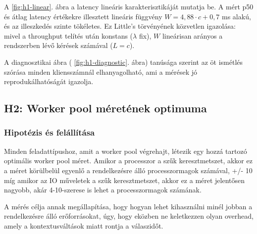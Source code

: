 \documentclass[11pt,a4paper]{article}
\begin{document}
A \ref{fig:h1-linear}. ábra a latency lineáris karakterisztikáját mutatja be. A mért
p50 és átlag latency értékekre illesztett lineáris függvény $W = 4{,}88 \cdot c + 0{,}7$
ms alakú, és az illeszkedés szinte tökéletes. Ez Little's törvényének közvetlen
igazolása: mivel a throughput telítés után konstans ($\lambda$ fix), $W$ lineárisan
arányos a rendszerben lévő kérések számával ($L = c$).

A diagnosztikai ábra ( \ref{fig:h1-diagnostic}. ábra) tanúsága szerint az öt
ismétlés szórása minden kliensszámnál elhanyagolható, ami a mérések jó
reprodukálhatóságát igazolja.


\subsection{H2: Worker pool méretének optimuma}
\label{ssec:h2}


\subsubsection{Hipotézis és felállítása}
\label{sssec:h2-hipotezis}


Minden feladattípushoz, amit a worker pool végrehajt, létezik egy hozzá tartozó optimális worker pool méret. 
Amikor a processzor a szűk keresztmetszet, akkor ez a méret körülbelül egyenlő a rendelkezésre álló processzormagok számával, +/- 10%
míg amikor az IO műveletek a szűk keresztmetszet, akkor ez a méret jelentősen nagyobb, akár 4-10-szerese is lehet a processzormagok számának.

A mérés célja annak megállapítása, hogy hogyan lehet kihasználni minél jobban a rendelkezésre álló erőforrásokat,
úgy, hogy eközben ne keletkezzen olyan overhead, amely a kontextusváltások miatt rontja a válaszidőt.
\end{document}
